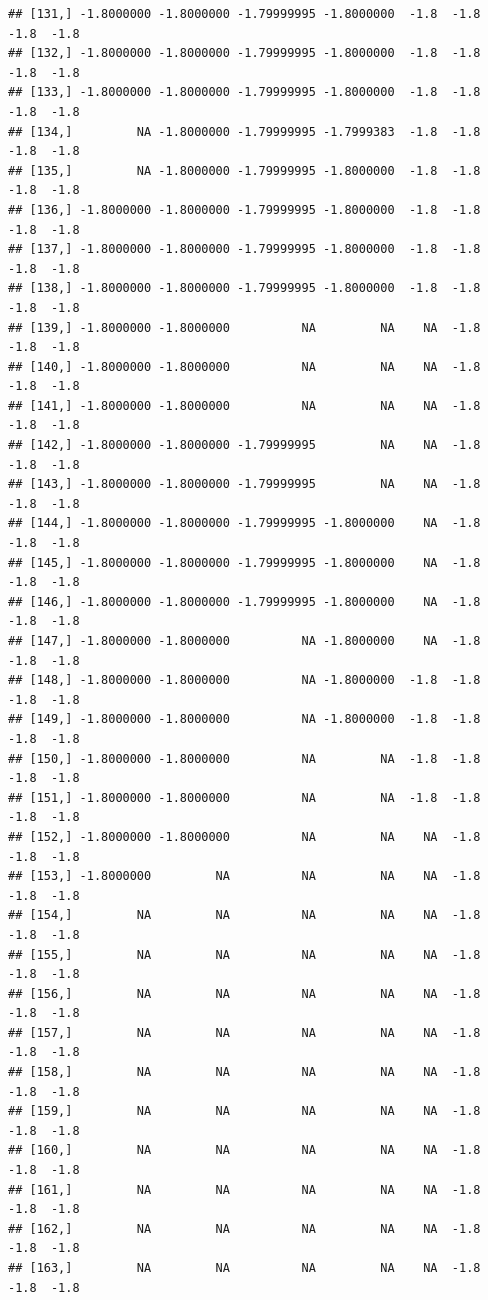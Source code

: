 \documentclass{article}\usepackage[]{graphicx}\usepackage[]{color}
\makeatletter
\newenvironment{kframe}{%
 \def\at@end@of@kframe{}%
 \ifinner\ifhmode%
  \def\at@end@of@kframe{\end{minipage}}%
  \begin{minipage}{\columnwidth}%
 \fi\fi%
 \def\FrameCommand##1{\hskip\@totalleftmargin \hskip-\fboxsep
 \colorbox{shadecolor}{##1}\hskip-\fboxsep
     \hskip-\linewidth \hskip-\@totalleftmargin \hskip\columnwidth}%
 \MakeFramed {\advance\hsize-\width
   \@totalleftmargin\z@ \linewidth\hsize
   \@setminipage}}%
 {\par\unskip\endMakeFramed%
 \at@end@of@kframe}
\newenvironment{knitrout}{}{} %
\makeatother
\begin{document}
\begin{knitrout}
\begin{kframe}
\begin{verbatim}
## [131,] -1.8000000 -1.8000000 -1.79999995 -1.8000000  -1.8  -1.8  -1.8  -1.8
## [132,] -1.8000000 -1.8000000 -1.79999995 -1.8000000  -1.8  -1.8  -1.8  -1.8
## [133,] -1.8000000 -1.8000000 -1.79999995 -1.8000000  -1.8  -1.8  -1.8  -1.8
## [134,]         NA -1.8000000 -1.79999995 -1.7999383  -1.8  -1.8  -1.8  -1.8
## [135,]         NA -1.8000000 -1.79999995 -1.8000000  -1.8  -1.8  -1.8  -1.8
## [136,] -1.8000000 -1.8000000 -1.79999995 -1.8000000  -1.8  -1.8  -1.8  -1.8
## [137,] -1.8000000 -1.8000000 -1.79999995 -1.8000000  -1.8  -1.8  -1.8  -1.8
## [138,] -1.8000000 -1.8000000 -1.79999995 -1.8000000  -1.8  -1.8  -1.8  -1.8
## [139,] -1.8000000 -1.8000000          NA         NA    NA  -1.8  -1.8  -1.8
## [140,] -1.8000000 -1.8000000          NA         NA    NA  -1.8  -1.8  -1.8
## [141,] -1.8000000 -1.8000000          NA         NA    NA  -1.8  -1.8  -1.8
## [142,] -1.8000000 -1.8000000 -1.79999995         NA    NA  -1.8  -1.8  -1.8
## [143,] -1.8000000 -1.8000000 -1.79999995         NA    NA  -1.8  -1.8  -1.8
## [144,] -1.8000000 -1.8000000 -1.79999995 -1.8000000    NA  -1.8  -1.8  -1.8
## [145,] -1.8000000 -1.8000000 -1.79999995 -1.8000000    NA  -1.8  -1.8  -1.8
## [146,] -1.8000000 -1.8000000 -1.79999995 -1.8000000    NA  -1.8  -1.8  -1.8
## [147,] -1.8000000 -1.8000000          NA -1.8000000    NA  -1.8  -1.8  -1.8
## [148,] -1.8000000 -1.8000000          NA -1.8000000  -1.8  -1.8  -1.8  -1.8
## [149,] -1.8000000 -1.8000000          NA -1.8000000  -1.8  -1.8  -1.8  -1.8
## [150,] -1.8000000 -1.8000000          NA         NA  -1.8  -1.8  -1.8  -1.8
## [151,] -1.8000000 -1.8000000          NA         NA  -1.8  -1.8  -1.8  -1.8
## [152,] -1.8000000 -1.8000000          NA         NA    NA  -1.8  -1.8  -1.8
## [153,] -1.8000000         NA          NA         NA    NA  -1.8  -1.8  -1.8
## [154,]         NA         NA          NA         NA    NA  -1.8  -1.8  -1.8
## [155,]         NA         NA          NA         NA    NA  -1.8  -1.8  -1.8
## [156,]         NA         NA          NA         NA    NA  -1.8  -1.8  -1.8
## [157,]         NA         NA          NA         NA    NA  -1.8  -1.8  -1.8
## [158,]         NA         NA          NA         NA    NA  -1.8  -1.8  -1.8
## [159,]         NA         NA          NA         NA    NA  -1.8  -1.8  -1.8
## [160,]         NA         NA          NA         NA    NA  -1.8  -1.8  -1.8
## [161,]         NA         NA          NA         NA    NA  -1.8  -1.8  -1.8
## [162,]         NA         NA          NA         NA    NA  -1.8  -1.8  -1.8
## [163,]         NA         NA          NA         NA    NA  -1.8  -1.8  -1.8

\end{verbatim}
\end{kframe}
\end{knitrout}
\end{document}
